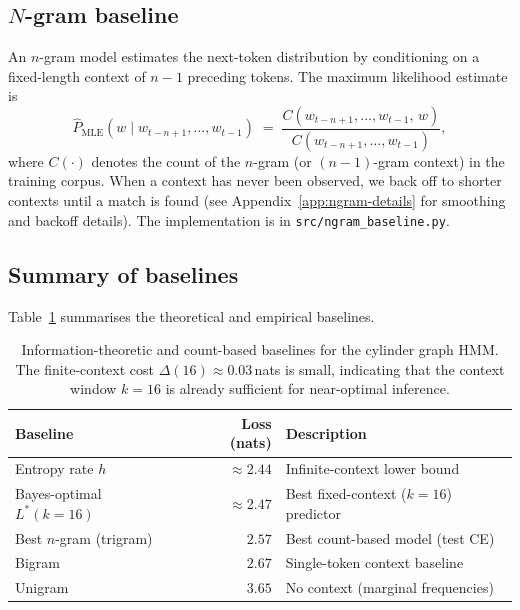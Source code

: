 \documentclass[11pt]{article}
\begin{document}
\subsection{$N$-gram baseline}\label{sec:ngram-baseline}

An $n$-gram model estimates the next-token distribution by conditioning
on a fixed-length context of $n{-}1$ preceding tokens.  The maximum
likelihood estimate is
\begin{equation}\label{eq:ngram-mle}
  \hat{P}_{\text{MLE}}(w \mid w_{t-n+1},\dots,w_{t-1})
  \;=\; \frac{C(w_{t-n+1},\dots,w_{t-1},\, w)}
             {C(w_{t-n+1},\dots,w_{t-1})},
\end{equation}
where $C(\cdot)$ denotes the count of the $n$-gram (or $(n{-}1)$-gram
context) in the training corpus.  When a context has never been observed,
we back off to shorter contexts until a match is found (see
Appendix~\ref{app:ngram-details} for smoothing and backoff details).
The implementation is in \texttt{src/ngram\_baseline.py}.

\subsection{Summary of baselines}

Table~\ref{tab:baselines} summarises the theoretical and empirical
baselines.

\begin{table}[htbp]
  \centering
  \begin{tabular}{l r l}
    \toprule
    Baseline & Loss (nats) & Description \\
    \midrule
    Entropy rate $h$ & $\approx 2.44$ & Infinite-context lower bound \\
    Bayes-optimal $L^{*}(k{=}16)$ & $\approx 2.47$ & Best fixed-context ($k{=}16$) predictor \\
    Best $n$-gram (trigram) & $2.57$ & Best count-based model (test CE) \\
    Bigram & $2.67$ & Single-token context baseline \\
    Unigram & $3.65$ & No context (marginal frequencies) \\
    \bottomrule
  \end{tabular}
  \caption{Information-theoretic and count-based baselines for the
           cylinder graph HMM\@.  The finite-context cost
           $\Delta(16) \approx 0.03$\,nats is small, indicating that the
           context window $k = 16$ is already sufficient for near-optimal
           inference.}
  \label{tab:baselines}
\end{table}
\end{document}
